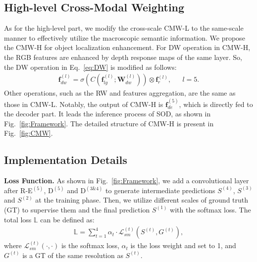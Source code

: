 \documentclass[runningheads]{llncs}
\begin{document}
\subsection{High-level Cross-Modal Weighting}
\label{sec:CW}
As for the high-level part, we modify the cross-scale CMW-L to the same-scale 
manner to effectively utilize the macroscopic semantic information.
We propose the CMW-H for object localization enhancement.
For DW operation in CMW-H, the RGB features are enhanced by
depth response maps of the same layer.
So, the DW operation in Eq.~\ref{eq:DW} is modified as follows:
\begin{equation}
   \begin{aligned}
    \mathbf{f}^{(l)}_{dw} = \sigma(C(\mathbf{f}^{(l)}_{lg};\mathbf{W}^{(l)}_{dw})) \otimes \mathbf{f}^{(l)}_{r},  &     & l=5.
    \label{eq:DRMapCW}
    \end{aligned}
\end{equation}
Other operations, such as the RW and features aggregation,
are the same as those in CMW-L.
Notably, the output of CMW-H is $\mathbf{f}^{(5)}_{de}$,
which is directly fed to the decoder part.
It leads the inference process of SOD,
as shown in Fig.~\ref{fig:Framework}.
The detailed structure of CMW-H is present in Fig.~\ref{fig:CMW}.



\subsection{Implementation Details}
\label{sec:Details}

\noindent\textbf{Loss Function.}
As shown in Fig.~\ref{fig:Framework}, we add a convolutional layer after
R-E$^{(5)}$, D$^{(5)}$ and D$^{(3\&4)}$ to generate
intermediate predictions $S^{(4)}$, $S^{(3)}$ and $S^{(2)}$ at the
training phase.
Then, we utilize different scales of ground truth (GT) to supervise them
and the final prediction $S^{(1)}$ with the softmax loss.
The total loss $\mathbb{L}$ can be defined as:
\begin{equation}
   \begin{aligned}
    \mathbb{L}  = \sum\limits_{t=1}^4 \alpha_{t} \cdot  \mathcal{L}^{(t)}_{sm} (S^{(t)},G^{(t)}),
    \label{eq:TotalLoss}
    \end{aligned}
\end{equation}
where $\mathcal{L}^{(t)}_{sm} (\cdot,\cdot)$ is the softmax loss,
$\alpha_{t}$ is the loss weight and set to 1,
and $G^{(t)}$ is a GT of the same resolution as $S^{(t)}$.
\end{document}
